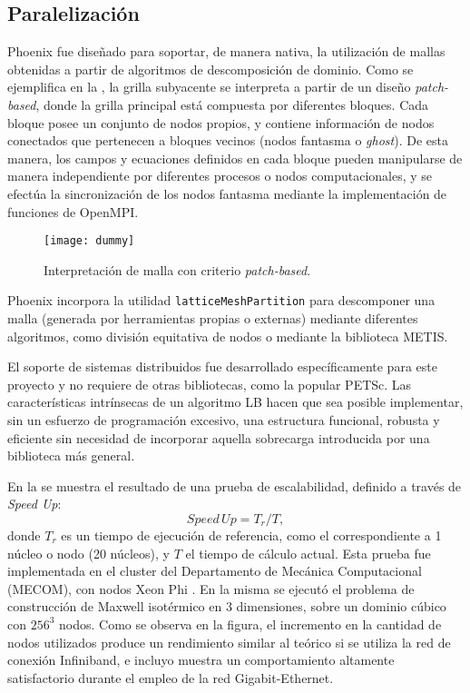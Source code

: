 \subsection{Paralelizaci\'on}

Phoenix fue dise\~nado para soportar, de manera nativa, la utilizaci\'on de mallas obtenidas a partir de algoritmos de descomposici\'on de dominio. Como se ejemplifica en la , la grilla subyacente se interpreta a partir de un dise\~no \emph{patch-based}, donde la grilla principal est\'a compuesta por diferentes bloques. Cada bloque posee un conjunto de nodos propios, y contiene informaci\'on de nodos conectados que pertenecen a bloques vecinos (nodos fantasma o \emph{ghost}). De esta manera, los campos y ecuaciones definidos en cada bloque pueden manipularse de manera independiente por diferentes procesos o nodos computacionales, y se efect\'ua la sincronizaci\'on de los nodos fantasma mediante la implementaci\'on de funciones de OpenMPI. 

\begin{figure}[ht]
	\centering
	\texttt{[image: dummy]}
	\caption{Interpretaci\'on de malla con criterio \emph{patch-based}.}
	\label{fig:patch_based}
\end{figure}

Phoenix incorpora la utilidad \texttt{latticeMeshPartition} para descomponer una malla (generada por herramientas propias o externas) mediante diferentes algoritmos, como divisi\'on equitativa de nodos o mediante la biblioteca METIS.

El soporte de sistemas distribuidos fue desarrollado espec\'ificamente para este proyecto y no requiere de otras bibliotecas, como la popular PETSc. Las caracter\'isticas intr\'insecas de un algoritmo LB hacen que sea posible implementar, sin un esfuerzo de programaci\'on excesivo, una estructura funcional, robusta y eficiente sin necesidad de incorporar aquella sobrecarga introducida por una biblioteca m\'as general. 

En la  se muestra el resultado de una prueba de escalabilidad, definido a trav\'es de \emph{Speed Up}:
\begin{equation}
	Speed\,Up = T_r / T,
\end{equation}
donde $T_r$ es un tiempo de ejecuci\'on de referencia, como el correspondiente a 1 n\'ucleo o nodo (20 n\'ucleos), y $T$ el tiempo de c\'alculo actual. Esta prueba fue implementada en el cluster del Departamento de Mec\'anica Computacional (MECOM), con nodos Xeon Phi . En la misma se ejecut\'o el problema de construcci\'on de Maxwell isot\'ermico en 3 dimensiones, sobre un dominio c\'ubico con $256^3$ nodos. Como se observa en la figura, el incremento en la cantidad de nodos utilizados produce un rendimiento similar al te\'orico si se utiliza la red de conexi\'on Infiniband, e incluyo muestra un comportamiento altamente satisfactorio durante el empleo de la red Gigabit-Ethernet.

